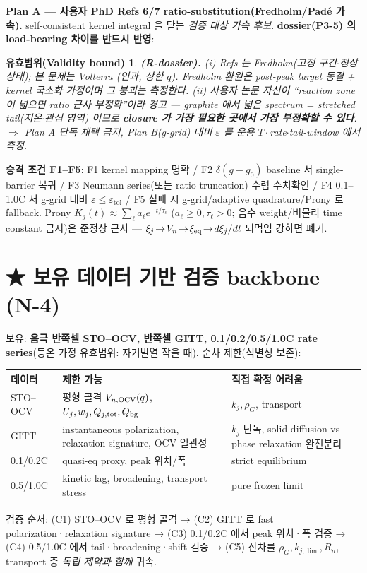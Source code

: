 \documentclass[11pt,a4paper]{article}
\newtheorem*{boundbox}{유효범위(Validity bound)}
\begin{document}
\textbf{Plan A — 사용자 PhD Refs 6/7 \cite{lee2011,son2013} ratio-substitution(Fredholm/Padé 가속).}
self-consistent kernel integral 을 닫는 \emph{검증 대상 가속 후보}. \textbf{dossier(P3-5) 의
load-bearing 차이를 반드시 반영}:
\begin{boundbox}
\textbf{(R-dossier).} (i) Refs 는 \emph{Fredholm}(고정 구간$\cdot$정상상태); 본 문제는 \emph{Volterra}
(인과, 상한 $q$). Fredholm 환원은 post-peak target 동결 + kernel 국소화 가정이며 그 붕괴는
\emph{측정}한다. (ii) 사용자 논문 자신이 ``reaction zone 이 넓으면 ratio 근사 부정확''이라 경고 —
graphite 에서 \emph{넓은 spectrum = stretched tail(저온$\cdot$관심 영역)} 이므로 \textbf{closure 가 가장
필요한 곳에서 가장 부정확할 수 있다}. $\Rightarrow$ Plan A 단독 채택 금지, Plan B(g-grid) 대비
$\varepsilon$ 를 \emph{운용 $T\cdot$rate$\cdot$tail-window} 에서 측정.
\end{boundbox}
\textbf{승격 조건 F1--F5}: F1 kernel mapping 명확 / F2 $\delta(g-g_0)$ baseline 서 single-barrier
복귀 / F3 Neumann series(또는 ratio truncation) 수렴 수치확인 / F4 0.1--1.0C 서 g-grid 대비
$\varepsilon\le\varepsilon_\mathrm{tol}$ / F5 실패 시 g-grid/adaptive quadrature/Prony 로 fallback.
Prony $K_j(t)\approx\sum_\ell a_\ell e^{-t/\tau_\ell}$ ($a_\ell\ge0,\tau_\ell>0$; 음수 weight/비물리
time constant 금지)은 준정상 근사 — $\xi_j\!\to\!V_n\!\to\!\xi_{\mathrm{eq}}\!\to\!d\xi_j/dt$ 되먹임 강하면 폐기.

\section{★ 보유 데이터 기반 검증 backbone (N-4)}\label{sec:ch6_validate}
보유: \textbf{음극 반쪽셀 STO--OCV, 반쪽셀 GITT, 0.1/0.2/0.5/1.0C rate series}(등온 가정 유효범위:
자기발열 작을 때). 순차 제한(식별성 보존):
\begin{longtable}{p{} p{} p{}}
\toprule 데이터 & 제한 가능 & 직접 확정 어려움 \\ \midrule \endhead
STO--OCV & 평형 골격 $V_{n,\mathrm{OCV}}(q)$, $U_j,w_j,Q_{j,\mathrm{tot}},Q_{\mathrm{bg}}$ & $k_j,\rho_G$, transport \\
GITT & instantaneous polarization, relaxation signature, OCV 일관성 & $k_j$ 단독, solid-diffusion vs phase relaxation 완전분리 \\
0.1/0.2C & quasi-eq proxy, peak 위치/폭 & strict equilibrium \\
0.5/1.0C & kinetic lag, broadening, transport stress & pure frozen limit \\
\bottomrule
\end{longtable}
검증 순서: (C1) STO--OCV 로 평형 골격 → (C2) GITT 로 fast polarization·relaxation signature →
(C3) 0.1/0.2C 에서 peak 위치·폭 검증 → (C4) 0.5/1.0C 에서 tail·broadening·shift 검증 →
(C5) 잔차를 $\rho_G,k_{j,\lim},R_n$, transport 중 \emph{독립 제약과 함께} 귀속.
\end{document}
